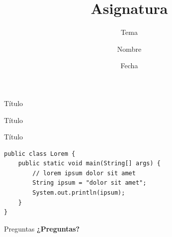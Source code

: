 \documentclass[aspectratio=169]{beamer}
\title[Corto]{Asignatura}
\subtitle{Tema}
\author{Nombre}
\institute{Universidad}
\date{Fecha}
\begin{document}
\begin{frame}[plain]
  \maketitle
\end{frame}

\begin{frame}{Título}

\end{frame}

\begin{frame}{Título}

\end{frame}

\begin{frame}[fragile]{Título}
\begin{lstlisting}[style=codigo]
public class Lorem {
    public static void main(String[] args) {
        // lorem ipsum dolor sit amet
        String ipsum = "dolor sit amet";
        System.out.println(ipsum);
    }
}
\end{lstlisting}
\end{frame}

\begin{frame}{Preguntas}
    \centering
    \Huge \textbf{¿Preguntas?}
\end{frame}
\end{document}
